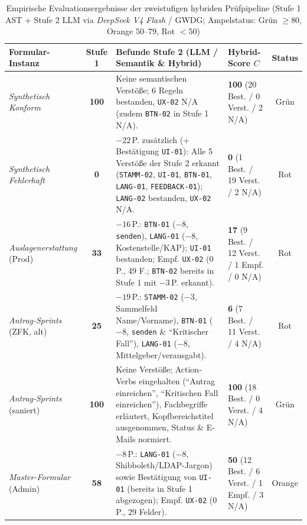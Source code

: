 \begin{table}[htbp]
\centering
\scriptsize
\begin{tabularx}{\textwidth}{>{\raggedright\arraybackslash}p{2.5cm}c>{\raggedright\arraybackslash}X>{\raggedright\arraybackslash}p{3.1cm}c}
\toprule
\textbf{Formular-Instanz} & \textbf{Stufe 1} & \textbf{Befunde Stufe 2 (LLM / Semantik \& Hybrid)} & \textbf{Hybrid-Score $C$} & \textbf{Status} \\
\midrule
\textit{Synthetisch Konform} & \textbf{100} & Keine semantischen Verstöße; 6 Regeln bestanden, \texttt{UX-02} N/A (zudem \texttt{BTN-02} in Stufe 1 N/A). & \textbf{100} (20 Best. / 0 Verst. / 2 N/A) & Grün \\
\textit{Synthetisch Fehlerhaft} & \textbf{0} & $-22$\,P. zusätzlich (+ Bestätigung \texttt{UI-01}): Alle 5 Verstöße der Stufe 2 erkannt (\texttt{STAMM-02}, \texttt{UI-01}, \texttt{BTN-01}, \texttt{LANG-01}, \texttt{FEEDBACK-01}); \texttt{LANG-02} bestanden, \texttt{UX-02} N/A. & \textbf{0} (1 Best. / 19 Verst. / 2 N/A) & Rot \\
\midrule
\textit{Auslagen\-erstattung} (Prod) & \textbf{33} & $-16$\,P.: \texttt{BTN-01} ($-8$, \texttt{senden}), \texttt{LANG-01} ($-8$, Kostenstelle/KAP); \texttt{UI-01} bestanden; Empf. \texttt{UX-02} ($0$\,P., 49 F.; \texttt{BTN-02} bereits in Stufe 1 mit $-3$\,P. erkannt). & \textbf{17} (9 Best. / 12 Verst. / 1 Empf. / 0 N/A) & Rot \\
\textit{Antrag-Sprints} (ZFK, alt) & \textbf{25} & $-19$\,P.: \texttt{STAMM-02} ($-3$, Sammelfeld Name/Vorname), \texttt{BTN-01} ($-8$, \texttt{senden} \& \enquote{Kritischer Fall}), \texttt{LANG-01} ($-8$, Mittelgeber/verausgabt). & \textbf{6} (7 Best. / 11 Verst. / 4 N/A) & Rot \\
\textit{Antrag-Sprints} (saniert) & \textbf{100} & Keine Verstöße; Action-Verbs eingehalten (\enquote{Antrag einreichen}, \enquote{Kritischen Fall einreichen}), Fachbegriffe erläutert, Kopfbereichstitel ausgenommen, Status \& E-Mails normiert. & \textbf{100} (18 Best. / 0 Verst. / 4 N/A) & Grün \\
\textit{Master-Formular} (Admin) & \textbf{58} & $-8$\,P.: \texttt{LANG-01} ($-8$, Shibboleth/LDAP-Jargon) sowie Bestätigung von \texttt{UI-01} (bereits in Stufe 1 abgezogen); Empf. \texttt{UX-02} ($0$\,P., 29 Felder). & \textbf{50} (12 Best. / 6 Verst. / 1 Empf. / 3 N/A) & Orange \\
\bottomrule
\end{tabularx}
\caption{Empirische Evaluationsergebnisse der zweistufigen hybriden Prüfpipeline (Stufe 1 AST + Stufe 2 LLM via \textit{DeepSeek V4 Flash} / GWDG; Ampelstatus: Grün $\ge 80$, Orange $50\text{--}79$, Rot $< 50$)}
\label{tab:eval_results}
\end{table}

